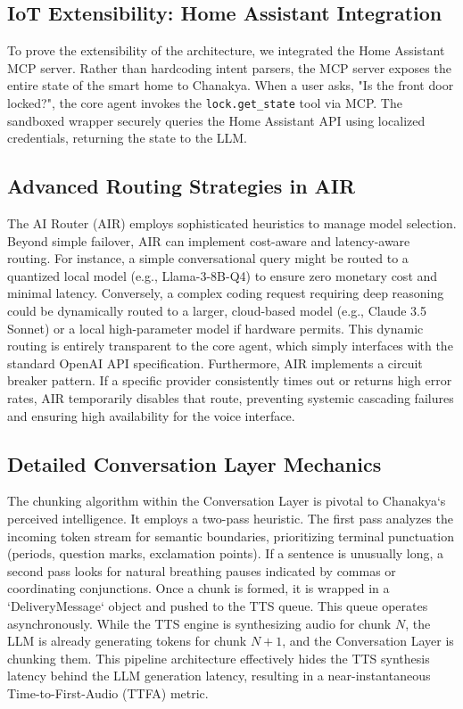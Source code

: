 \documentclass[conference]{IEEEtran}
\begin{document}
\subsection{IoT Extensibility: Home Assistant Integration}
To prove the extensibility of the architecture, we integrated the Home Assistant MCP server. Rather than hardcoding intent parsers, the MCP server exposes the entire state of the smart home to Chanakya. When a user asks, "Is the front door locked?", the core agent invokes the \texttt{lock.get\_state} tool via MCP. The sandboxed wrapper securely queries the Home Assistant API using localized credentials, returning the state to the LLM.




\subsection{Advanced Routing Strategies in AIR}
The AI Router (AIR) employs sophisticated heuristics to manage model selection. Beyond simple failover, AIR can implement cost-aware and latency-aware routing. For instance, a simple conversational query might be routed to a quantized local model (e.g., Llama-3-8B-Q4) to ensure zero monetary cost and minimal latency. Conversely, a complex coding request requiring deep reasoning could be dynamically routed to a larger, cloud-based model (e.g., Claude 3.5 Sonnet) or a local high-parameter model if hardware permits. This dynamic routing is entirely transparent to the core agent, which simply interfaces with the standard OpenAI API specification. Furthermore, AIR implements a circuit breaker pattern. If a specific provider consistently times out or returns high error rates, AIR temporarily disables that route, preventing systemic cascading failures and ensuring high availability for the voice interface.

\subsection{Detailed Conversation Layer Mechanics}
The chunking algorithm within the Conversation Layer is pivotal to Chanakya`s perceived intelligence. It employs a two-pass heuristic. The first pass analyzes the incoming token stream for semantic boundaries, prioritizing terminal punctuation (periods, question marks, exclamation points). If a sentence is unusually long, a second pass looks for natural breathing pauses indicated by commas or coordinating conjunctions. Once a chunk is formed, it is wrapped in a `DeliveryMessage` object and pushed to the TTS queue. This queue operates asynchronously. While the TTS engine is synthesizing audio for chunk $N$, the LLM is already generating tokens for chunk $N+1$, and the Conversation Layer is chunking them. This pipeline architecture effectively hides the TTS synthesis latency behind the LLM generation latency, resulting in a near-instantaneous Time-to-First-Audio (TTFA) metric.
\end{document}

